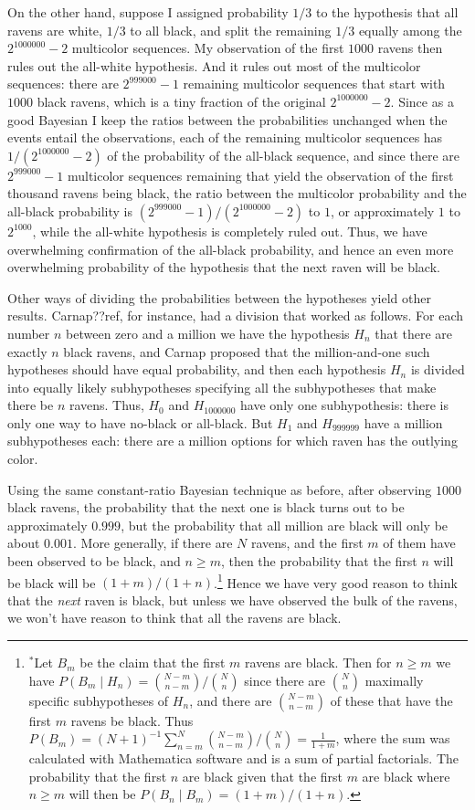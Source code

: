 On the other hand, suppose I assigned probability $1/3$ to the hypothesis that all ravens are white, $1/3$ to all black,
and split the remaining $1/3$ equally among the $2^{1000000}-2$ multicolor sequences. My observation of the first $1000$
ravens then rules out the all-white  hypothesis. And it rules out most of the multicolor sequences: there are $2^{999000}-1$
remaining multicolor sequences that start with $1000$ black ravens, which is a tiny fraction of the original $2^{1000000}-2$. Since as a 
good Bayesian I keep the ratios between the probabilities unchanged when the events entail the observations, each of the remaining multicolor sequences has 
$1/(2^{1000000}-2)$ of the probability of the all-black sequence, and since there are $2^{999000}-1$ multicolor
sequences remaining that yield the observation of the first thousand ravens being black, the ratio between the multicolor probability and the all-black probability
is $(2^{999000}-1)/(2^{1000000}-2)$ to $1$, or approximately $1$ to $2^{1000}$, while the all-white hypothesis
is completely ruled out. Thus, we have overwhelming confirmation of 
the all-black probability, and hence an even more overwhelming probability of the hypothesis that the next raven will be black.

Other ways of dividing the probabilities between the hypotheses yield other results. Carnap??ref, for instance, had a division
that worked as follows. For each number $n$ between zero and a million we have the hypothesis $H_n$ that there are exactly 
$n$ black ravens, and Carnap proposed that the million-and-one such hypotheses should have equal probability, and then 
each hypothesis $H_n$ is divided into equally likely subhypotheses specifying all the subhypotheses that make there be $n$
ravens. Thus, $H_0$ and $H_{1000000}$ have only one subhypothesis: there is only one way to have no-black or all-black. But
$H_1$ and $H_{999999}$ have a million subhypotheses each: there are a million options for which raven has the outlying
color. 

Using the same constant-ratio Bayesian technique as before, after observing $1000$ black ravens, the probability that the next one is black 
turns out to be approximately $0.999$, but the probability that all million are black will only be about $0.001$. More generally, if there
are $N$ ravens, and the first $m$ of them have been observed to be black, and $n\ge m$, then the probability that the first $n$
will be black will be $(1+m)/(1+n)$.\footnote{$^*$Let $B_m$ be the claim that the first $m$ ravens are black. Then
for $n\ge m$ we have $P(B_m\mid H_n)={N-m \choose n-m}/{N\choose n}$ since there are $N\choose n$ maximally specific subhypotheses of $H_n$, and there are ${N-m\choose n-m}$ of these that have the first $m$ ravens be black. 
Thus $P(B_m)=(N+1)^{-1}\sum_{n=m}^{N} {N-m \choose n-m}/{N\choose n} = \frac{1}{1+m}$, where the sum was
calculated with Mathematica software and is a sum of partial factorials. The probability that the first
$n$ are black given that the first $m$ are black where $n\ge m$ will then be $P(B_n\mid B_m)=(1+m)/(1+n)$.} 
  Hence we have very good reason to think that the \textit{next} raven is black,
but unless we have observed the bulk of the ravens, we won't have reason to think that all the ravens are black. 

